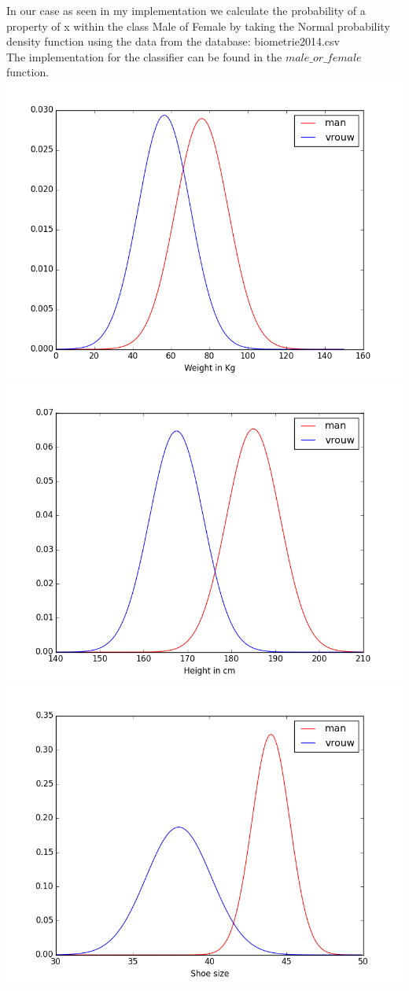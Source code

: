 \documentclass[pdftex,12pt,a4paper]{article}
\begin{document}
    	In our case as seen in my implementation we calculate the probability of a property of 
    	x within the class Male of Female by taking the Normal probability density function 
    	using the data from the database: \textrm{biometrie2014.csv}\\
    	The implementation for the classifier can be found in the $male\_or\_female$ function.
		\includegraphics[width=\linewidth]{naive_weight.png}
		\includegraphics[width=\linewidth]{naive_height.png}
		\includegraphics[width=\linewidth]{naive_shoe.png}
\end{document}
